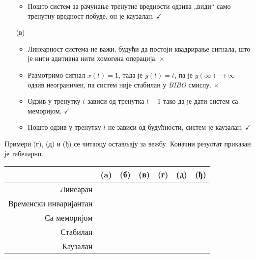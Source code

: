 \begin{enumerate}
\begin{itemize}
        \item Пошто систем за рачунање тренутне вредности одзива „види“ само тренутну вредност побуде, он је каузалан. \hfill $\checkmark$
    \end{itemize} 

    \item[(в)] 
    \begin{itemize}
        \item Линеарност система не важи, будући да постоји квадрирање сигнала, што је нити адитивна нити хомогена операција.
        \hfill $\times$

        \item Размотримо сигнал $x(t) = 1$, тада је $y(t) = t$, па је $y(\infty)\to\infty$ одзив неограничен, па 
        систем није стабилан у \textit{BIBO} смислу. \hfill $\times$

        \item Одзив у тренутку $t$ зависи од тренутка  $t-1$ тако да је дати систем са меморијом. \hfill $\checkmark$
        
        \item Пошто одзив у тренутку $t$ не зависи од будућности, систем је каузалан. \hfill $\checkmark$
    \end{itemize}
\end{enumerate}

Примери (г), (д) и (ђ) се читаоцу остављају за вежбу. Коначни резултат приказан је табеларно. 

\begin{center}
\newcommand{\cm}{\checkmark}
\begin{tabular}{r|cccccc}
    & (a) & (б) & (в) & (г) & (д) & (ђ) \\
     \hline
    Линеаран               
    & \cm & \cm &    & \cm & \cm &    \\ 
    Временски инваријантан 
    & \cm    & \cm &    &     &  \cm   &    \\ 
    Са меморијом 
    & \cm &     &\cm & \cm &   \cm  & \\
    Стабилан 
    &     & \cm  & \cm & &  & \cm \\
    Каузалан 
    & \cm & \cm & \cm & \cm & & \cm \\
    \end{tabular}
\end{center}    
